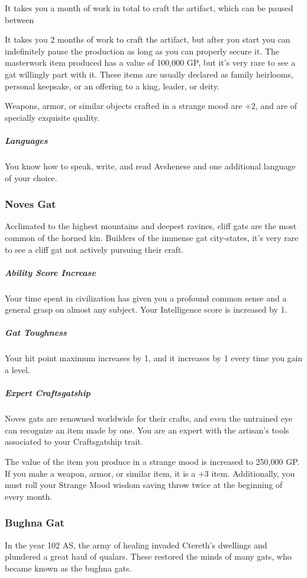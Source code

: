    It takes you a month of work in total to craft the artifact, which can be paused between

    It takes you 2 months of work to craft the artifact, but after you start you can indefinitely pause the production as long as you can properly secure it.
    The masterwork item produced has a value of 100,000 GP, but it's very rare to see a gat willingly part with it.
    These items are usually declared as family heirlooms, personal keepsake, or an offering to a king, leader, or deity.

    Weapons, armor, or similar objects crafted in a strange mood are +2, and are of specially exquisite quality.

    \subparagraph{Languages} You know how to speak, write, and read Avshenese and one additional language of your choice.

%

\subsubsection{Noves Gat}
    Acclimated to the highest mountains and deepest ravines, cliff gats are the most common of the horned kin.
    Builders of the immense gat city-states, it's very rare to see a cliff gat not actively pursuing their craft.

    \subparagraph{Ability Score Increase} Your time spent in civilization has given you a profound common sense and a general grasp on almost any subject.
    Your Intelligence score is increased by 1.

    \subparagraph{Gat Toughness} Your hit point maximum increases by 1, and it increases by 1 every time you gain a level.

    \subparagraph{Expert Craftsgatship} Noves gats are renowned worldwide for their crafts, and even the untrained eye can recognize an item made by one.
    You are an expert with the artisan's tools associated to your Craftsgatship trait.

    The value of the item you produce in a strange mood is increased to 250,000 GP.
    If you make a weapon, armor, or similar item, it is a +3 item.
    Additionally, you must roll your Strange Mood wisdom saving throw twice at the beginning of every month.

\subsubsection{Bughna Gat}
    In the year 102 AS, the army of healing invaded Ctereth's dwellings and plundered a great haul of qualars.
    These restored the minds of many gats, who became known as the bughna gats.

